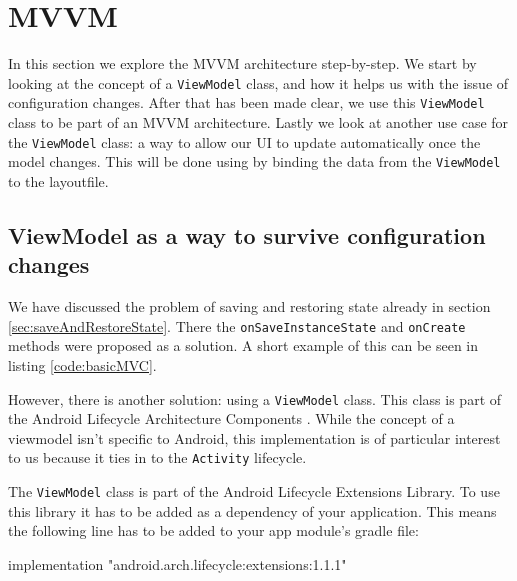 \section{MVVM}
In this section we explore the MVVM architecture step-by-step. 
We start by looking at the concept of a \lstinline!ViewModel! class, and how it helps us with the issue of configuration changes.
After that has been made clear, we use this \lstinline!ViewModel! class to be part of an MVVM architecture. 
Lastly we look at another use case for the \lstinline!ViewModel! class: a way to allow our UI to update automatically once the model changes. 
This will be done using by binding the data from the \lstinline!ViewModel! to the layoutfile.

\subsection{ViewModel as a way to survive configuration changes}
We have discussed the problem of saving and restoring state already in section \ref{sec:saveAndRestoreState}. 
There the \lstinline!onSaveInstanceState! and \lstinline!onCreate! methods were proposed as a solution.
A short example of this can be seen in listing \ref{code:basicMVC}.



However, there is another solution: using a \lstinline!ViewModel! class.
This class is part of the Android Lifecycle Architecture Components \cite{viewModelOfficial}.
While the concept of a viewmodel isn't specific to Android, this implementation is of particular interest to us because it ties in to the \lstinline!Activity! lifecycle.

The \lstinline!ViewModel! class is part of the Android Lifecycle Extensions Library.
To use this library it has to be added as a dependency of your application.
This means the following line has to be added to your app module's gradle file:

\begin{android}
	implementation "android.arch.lifecycle:extensions:1.1.1"
\end{android}


